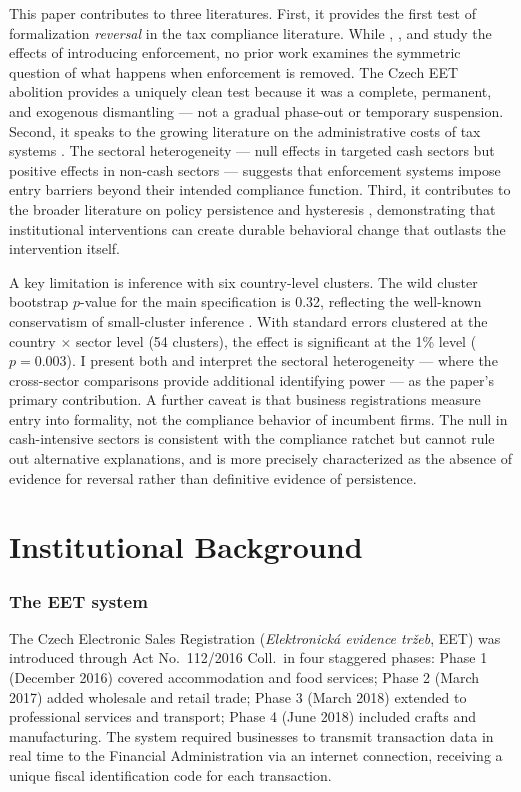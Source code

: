 \documentclass[12pt]{article}
\begin{document}
This paper contributes to three literatures. First, it provides the first test of formalization \textit{reversal} in the tax compliance literature. While \citet{naritomi2019}, \citet{pomeranz2015}, and \citet{almunia2018} study the effects of introducing enforcement, no prior work examines the symmetric question of what happens when enforcement is removed. The Czech EET abolition provides a uniquely clean test because it was a complete, permanent, and exogenous dismantling --- not a gradual phase-out or temporary suspension. Second, it speaks to the growing literature on the administrative costs of tax systems \citep{slemrod2006optimal, djankov2010effect}. The sectoral heterogeneity --- null effects in targeted cash sectors but positive effects in non-cash sectors --- suggests that enforcement systems impose entry barriers beyond their intended compliance function. Third, it contributes to the broader literature on policy persistence and hysteresis \citep{blanchard1986hysteresis, broner2021fiscal}, demonstrating that institutional interventions can create durable behavioral change that outlasts the intervention itself.

A key limitation is inference with six country-level clusters. The wild cluster bootstrap $p$-value for the main specification is 0.32, reflecting the well-known conservatism of small-cluster inference \citep{cameron2008bootstrap}. With standard errors clustered at the country $\times$ sector level (54 clusters), the effect is significant at the 1\% level ($p = 0.003$). I present both and interpret the sectoral heterogeneity --- where the cross-sector comparisons provide additional identifying power --- as the paper's primary contribution. A further caveat is that business registrations measure entry into formality, not the compliance behavior of incumbent firms. The null in cash-intensive sectors is consistent with the compliance ratchet but cannot rule out alternative explanations, and is more precisely characterized as the absence of evidence for reversal rather than definitive evidence of persistence.


\section{Institutional Background}

\subsubsection*{The EET system} The Czech Electronic Sales Registration (\textit{Elektronická evidence tržeb}, EET) was introduced through Act No.\ 112/2016 Coll.\ in four staggered phases: Phase 1 (December 2016) covered accommodation and food services; Phase 2 (March 2017) added wholesale and retail trade; Phase 3 (March 2018) extended to professional services and transport; Phase 4 (June 2018) included crafts and manufacturing. The system required businesses to transmit transaction data in real time to the Financial Administration via an internet connection, receiving a unique fiscal identification code for each transaction.
\end{document}
